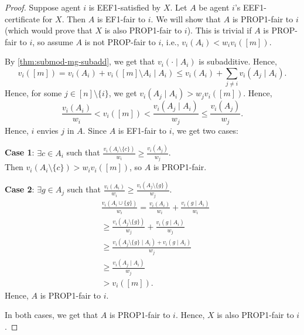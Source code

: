 \begin{proof}
Suppose agent $i$ is EEF1-satisfied by $X$.
Let $A$ be agent $i$'s EEF1-certificate for $X$.
Then $A$ is EF1-fair to $i$.
We will show that $A$ is PROP1-fair to $i$
(which would prove that $X$ is also PROP1-fair to $i$).
This is trivial if $A$ is PROP-fair to $i$,
so assume $A$ is not PROP-fair to $i$, i.e., $v_i(A_i) < w_iv_i([m])$.

By \cref{thm:submod-mg-subadd}, we get that
$v_i(\cdot \mid A_i)$ is subadditive. Hence,
\[ v_i([m]) = v_i(A_i) + v_i([m] \setminus A_i \mid A_i)
    \le v_i(A_i) + \sum_{j \neq i} v_i(A_j \mid A_i). \]
Hence, for some $j \in [n] \setminus \{i\}$,
we get $v_i(A_j \mid A_i) > w_jv_i([m])$. Hence,
\[ \frac{v_i(A_i)}{w_i} < v_i([m]) < \frac{v_i(A_j \mid A_i)}{w_j} \le \frac{v_i(A_j)}{w_j}. \]
Hence, $i$ envies $j$ in $A$. Since $A$ is EF1-fair to $i$, we get two cases:

\textbf{Case 1}: $\exists c \in A_i$ such that
    $\displaystyle \frac{v_i(A_i \setminus \{c\})}{w_i} \ge \frac{v_i(A_j)}{w_j}$.
\\ Then $v_i(A_i \setminus \{c\}) > w_iv_i([m])$, so $A$ is PROP1-fair.

\textbf{Case 2}: $\exists g \in A_j$ such that
    $\displaystyle \frac{v_i(A_i)}{w_i} \ge \frac{v_i(A_j \setminus \{g\})}{w_j}$.
\begin{align*}
& \frac{v_i(A_i \cup \{g\})}{w_i}
    = \frac{v_i(A_i)}{w_i} + \frac{v_i(g \mid A_i)}{w_i}
\\ &\ge \frac{v_i(A_j \setminus \{g\})}{w_j} + \frac{v_i(g \mid A_i)}{w_j}
    \tag{$w_i \le w_j$}
\\ &\ge \frac{v_i(A_j \setminus \{g\} \mid A_i) + v_i(g \mid A_i)}{w_j}
    \tag{$v_i$ is submodular}
\\ &\ge \frac{v_i(A_j \mid A_i)}{w_j}
    \tag{$v_i(\cdot \mid A_i)$ is subadditive}
\\ &> v_i([m]).
\end{align*}
Hence, $A$ is PROP1-fair to $i$.

In both cases, we get that $A$ is PROP1-fair to $i$.
Hence, $X$ is also PROP1-fair to $i$.
\end{proof}


